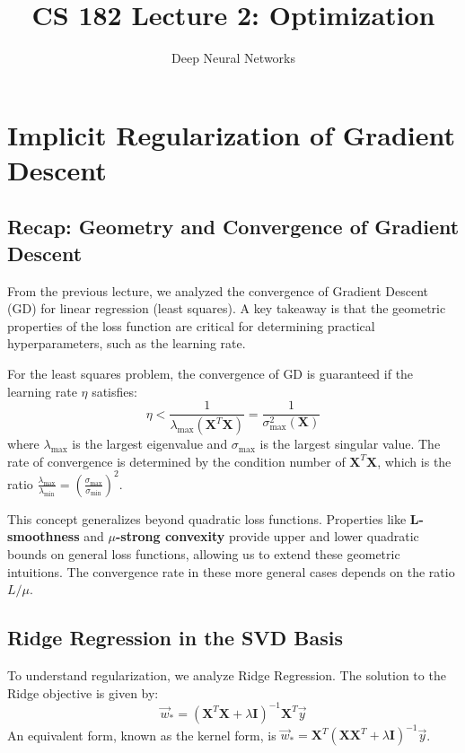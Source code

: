 \documentclass[11pt]{article}
\title{CS 182 Lecture 2: Optimization}
\author{Deep Neural Networks}
\newcommand{\mat}[1]{\mathbf{#1}}
\begin{document}
\maketitle

\section{Implicit Regularization of Gradient Descent}

\subsection{Recap: Geometry and Convergence of Gradient Descent}
From the previous lecture, we analyzed the convergence of Gradient Descent (GD) for linear regression (least squares). A key takeaway is that the geometric properties of the loss function are critical for determining practical hyperparameters, such as the learning rate.

For the least squares problem, the convergence of GD is guaranteed if the learning rate $\eta$ satisfies:
\begin{equation}
    \eta < \frac{1}{\lambda_{\max}(\mat{X}^T \mat{X})} = \frac{1}{\sigma_{\max}^2(\mat{X})}
\end{equation}
where $\lambda_{\max}$ is the largest eigenvalue and $\sigma_{\max}$ is the largest singular value. The rate of convergence is determined by the condition number of $\mat{X}^T\mat{X}$, which is the ratio $\frac{\lambda_{\max}}{\lambda_{\min}} = \left(\frac{\sigma_{\max}}{\sigma_{\min}}\right)^2$.

This concept generalizes beyond quadratic loss functions. Properties like \textbf{L-smoothness} and \textbf{$\mu$-strong convexity} provide upper and lower quadratic bounds on general loss functions, allowing us to extend these geometric intuitions. The convergence rate in these more general cases depends on the ratio $L/\mu$.

\subsection{Ridge Regression in the SVD Basis}
To understand regularization, we analyze Ridge Regression. The solution to the Ridge objective is given by:
\begin{equation}
    \vec{w}_{*} = (\mat{X}^T \mat{X} + \lambda \mat{I})^{-1} \mat{X}^T \vec{y}
\end{equation}
An equivalent form, known as the kernel form, is $\vec{w}_{*} = \mat{X}^T (\mat{X} \mat{X}^T + \lambda \mat{I})^{-1} \vec{y}$.
\end{document}
